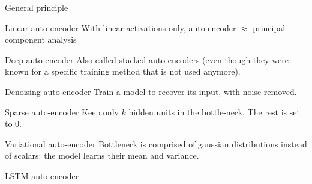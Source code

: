 \begin{frame}{General principle}
\end{frame}

\begin{frame}{Linear auto-encoder}
  With linear activations only, auto-encoder $\approx$ principal component analysis

\end{frame}

\begin{frame}{Deep auto-encoder}
  Also called stacked auto-encoders (even though they were known for a specific training method that is not used anymore).

\end{frame}

\begin{frame}{Denoising auto-encoder}
  Train a model to recover its input, with noise removed.

\end{frame}

\begin{frame}{Sparse auto-encoder}
  Keep only $k$ hidden units in the bottle-neck. The rest is set to 0.

\end{frame}

\begin{frame}{Variational auto-encoder}
  Bottleneck is comprised of gaussian distributions instead of scalars: the model learns their mean and variance.

\end{frame}

\begin{frame}{LSTM auto-encoder}
\end{frame}

